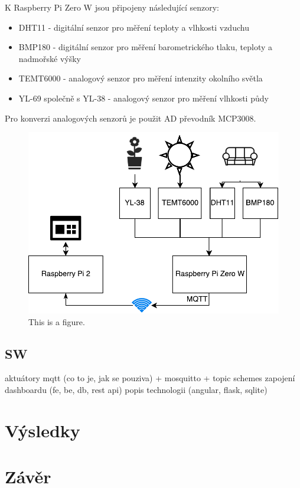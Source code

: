 \documentclass[11pt,a4paper]{article}
\begin{document}
K Raspberry Pi Zero W jsou připojeny následující senzory:

\begin{itemize}
    \item DHT11 - digitální senzor pro měření teploty a vlhkosti vzduchu
    \item BMP180 - digitální senzor pro měření barometrického tlaku, teploty a nadmořské výšky
    \item TEMT6000 - analogový senzor pro měření intenzity okolního světla
    \item YL-69 společně s YL-38 - analogový senzor pro měření vlhkosti půdy
\end{itemize}

Pro konverzi analogových senzorů je použit AD převodník MCP3008.


\begin{figure}[htb]
    \centering
    \includegraphics[width=0.5\linewidth]{weather-station-scheme}
    \caption{This is a figure.}
\end{figure}


\subsection{SW}\label{subsec:sw}
aktuátory
mqtt (co to je, jak se pouziva) + mosquitto + topic schemes
zapojení dashboardu (fe, be, db, rest api)
popis technologii (angular, flask, sqlite)

\section{Výsledky}
\label{sec:res}

\section{Závěr}
\label{sec:sum}
\end{document}
